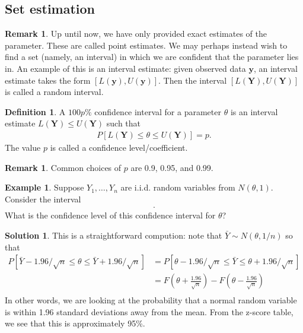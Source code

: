 \documentclass[11pt]{amsart}
\theoremstyle{definition}
\newtheorem{definition}[theorem]{Definition}
\newtheorem{remark}[theorem]{Remark}
\newtheorem{example}[theorem]{Example}
\newtheorem{solution}[theorem]{Solution}
\numberwithin{equation}{section}
\begin{document}
\subsection{Set estimation}
\begin{remark}
    Up until now, we have only provided exact estimates of the parameter. These are called point estimates. We may perhaps instead wish to find a set (namely, an interval) in which we are confident that the parameter lies in. An example of this is an interval estimate: given observed data $\mathbf{y}$, an interval estimate takes the form $[L(\mathbf{y}),U(\mathbf{y})]$. Then the interval $[L(\mathbf{Y}),U(\mathbf{Y})]$ is called a random interval.
\end{remark}
\begin{definition}
    A $100p\%$ confidence interval for a parameter $\theta$ is an interval estimate $L(\mathbf{Y})\le U(\mathbf{Y})$ such that
    \begin{align*}
        P[L(\mathbf{Y})\le\theta\le U(\mathbf{Y})]=p.
    \end{align*}
    The value $p$ is called a confidence level/coefficient.
\end{definition}
\begin{remark}
    Common choices of $p$ are 0.9, 0.95, and 0.99.
\end{remark}
\begin{example}
    Suppose $Y_1,\ldots,Y_n$ are i.i.d. random variables from $N(\theta,1)$. Consider the interval 
    \begin{align*}
        [\bar Y-1.96/\sqrt{n},\bar Y+1.96/\sqrt{n}].
    \end{align*}
    What is the confidence level of this confidence interval for $\theta$?
\end{example}
\addtocounter{theorem}{-1}
\begin{solution}
    This is a straightforward compution: note that $\bar Y\sim N(\theta,1/n)$ so that
    \begin{align*}
        P[\bar Y-1.96/\sqrt{n}\le\theta\le \bar Y+1.96/\sqrt{n}]&=P[\theta-1.96/\sqrt{n}\le\bar Y\le\theta+1.96/\sqrt{n}]\\
        &=F(\theta+\frac{1.96}{\sqrt{n}})-F(\theta-\frac{1.96}{\sqrt{n}})\\
    \end{align*}
    In other words, we are looking at the probability that a normal random variable is within 1.96 standard deviations away from the mean. From the z-score table, we see that this is approximately 95\%.
\end{solution}
\end{document}
